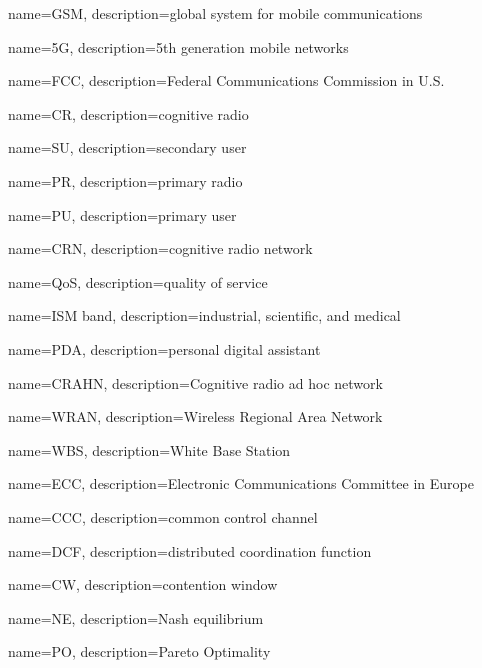 {
    name=GSM,
    description={global system for mobile communications}
}
 
 
 
{
    name=5G,
    description={5th generation mobile networks}
}
 
 
 
 
 


{
    name=FCC,
    description={Federal Communications Commission in U.S.}
}
 
 
{
    name=CR,
    description={cognitive radio}
}

{
    name=SU,
    description={secondary user}
}
 
{
    name=PR,
    description={primary radio}
} 
 
{
    name=PU,
    description={primary user}
}

 
{
    name=CRN,
    description={cognitive radio network}
}
 
 
{
    name=QoS,
    description={quality of service}
}


{
    name=ISM band,
    description={industrial, scientific, and medical}
}

{
    name=PDA,
    description={personal digital assistant}
}


{
    name=CRAHN,
    description={Cognitive radio ad hoc network}
}


{
    name=WRAN,
    description={Wireless Regional Area Network}
}


{
    name=WBS,
    description={White Base Station}
}


{
    name=ECC,
    description={Electronic Communications Committee in Europe}
}


{
    name=CCC,
    description={common control channel}
}


{
    name=DCF,
    description={distributed coordination function}
}


{
    name=CW,
    description={contention window}
}


{
    name=NE,
    description={Nash equilibrium}
}

{
    name=PO,
    description={Pareto Optimality}
}


